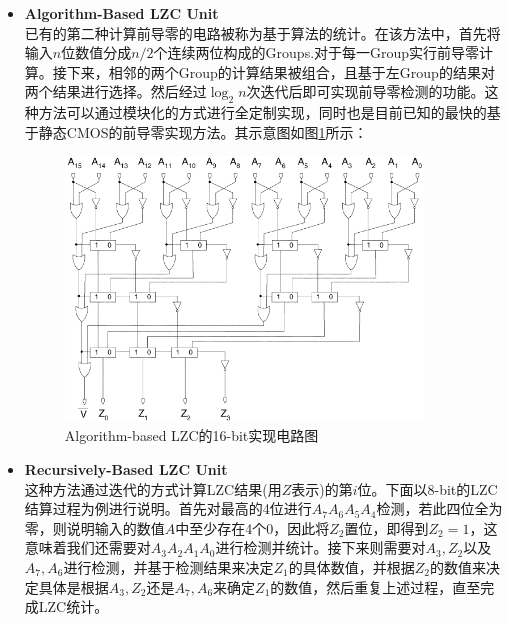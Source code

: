 \begin{itemize}
\item \textbf{Algorithm-Based LZC Unit} \\
已有的第二种计算前导零的电路被称为基于算法的统计。在该方法中，首先将输入$n$位数值分成$n/2$个连续两位构成的Groups.对于每一Group实行前导零计算。接下来，相邻的两个Group的计算结果被组合，且基于左Group的结果对两个结果进行选择。然后经过$\log_2n $次迭代后即可实现前导零检测的功能。这种方法可以通过模块化的方式进行全定制实现，同时也是目前已知的最快的基于静态CMOS的前导零实现方法。其示意图如图\ref{fig1.2}所示：
\begin{figure}[!hbtp]
\centering 
\includegraphics[width=0.9\textwidth]{chapter1/LZC_16bit}
\caption{Algorithm-based LZC的16-bit实现电路图}
\label{fig1.2}
\end{figure}
\item \textbf{Recursively-Based LZC Unit}\\
这种方法通过迭代的方式计算LZC结果(用$Z$表示)的第$i$位。下面以8-bit的LZC结算过程为例进行说明。首先对最高的4位进行$A_7A_6A_5A_4$检测，若此四位全为零，则说明输入的数值$A$中至少存在4个0，因此将$Z_2$置位，即得到$Z_2 = 1$，这意味着我们还需要对$A_3A_2A_1A_0$进行检测并统计。接下来则需要对$A_3,Z_2$以及$A_7,A_6$进行检测，并基于检测结果来决定$Z_1$的具体数值，并根据$Z_2$的数值来决定具体是根据$A_3,Z_2$还是$A_7,A_6$来确定$Z_1$的数值，然后重复上述过程，直至完成LZC统计。
\end{itemize}
